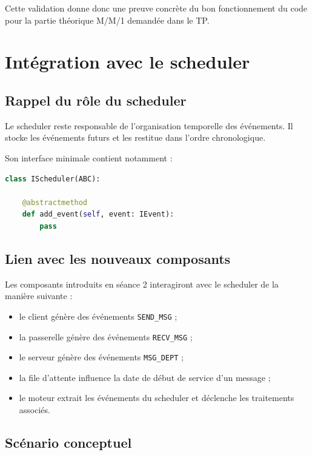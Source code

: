 \documentclass{article}
\begin{document}
Cette validation donne donc une preuve concrète du bon fonctionnement du code pour la partie théorique M/M/1 demandée dans le TP.

\section{Intégration avec le scheduler}

\subsection{Rappel du rôle du scheduler}

Le scheduler reste responsable de l’organisation temporelle des événements. Il stocke les événements futurs et les restitue dans l’ordre chronologique.

Son interface minimale contient notamment :

\begin{lstlisting}[language=Python, caption=Extrait de IScheduler.py]
class IScheduler(ABC):

    @abstractmethod
    def add_event(self, event: IEvent):
        pass
\end{lstlisting}

\subsection{Lien avec les nouveaux composants}

Les composants introduits en séance 2 interagiront avec le scheduler de la manière suivante :
\begin{itemize}[leftmargin=*]
    \item le client génère des événements \texttt{SEND\_MSG} ;
    \item la passerelle génère des événements \texttt{RECV\_MSG} ;
    \item le serveur génère des événements \texttt{MSG\_DEPT} ;
    \item la file d’attente influence la date de début de service d’un message ;
    \item le moteur extrait les événements du scheduler et déclenche les traitements associés.
\end{itemize}

\subsection{Scénario conceptuel}
\end{document}
